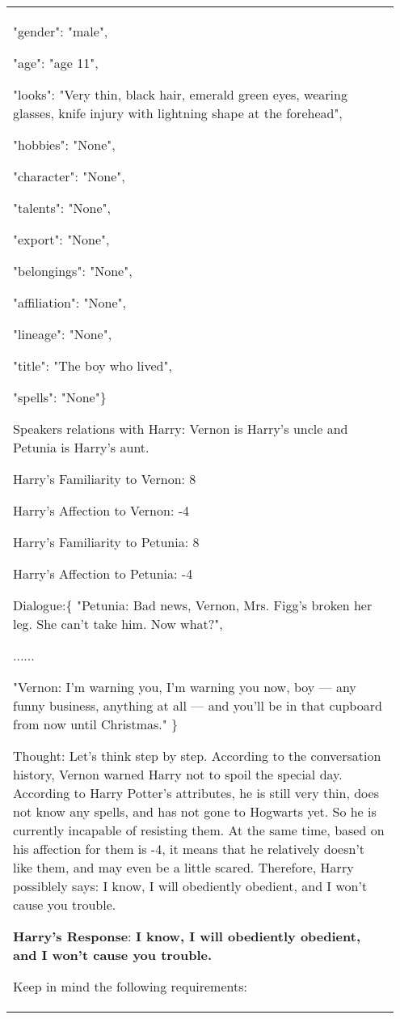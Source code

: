 \documentclass[11pt]{article}
\begin{document}
\begin{table*}[!t]
\begin{tabular}{p{0.95\linewidth}}
    "gender": "male",
    
    "age": "age 11",
    
    "looks": "Very thin, black hair,
    emerald green eyes, wearing glasses,
    knife injury with lightning shape at the forehead",
    
    "hobbies": "None",
    
    "character": "None",
    
    "talents": "None",
    
    "export": "None",
    
    "belongings": "None",
    
    "affiliation": "None",
    
    "lineage": "None",
    
    "title": "The boy who lived",
    
    "spells": "None"\}
    
            
Speakers relations with Harry:
Vernon is Harry's uncle and Petunia is Harry's aunt.

Harry’s Familiarity to Vernon: 8

Harry’s Affection to Vernon: -4

Harry's Familiarity to Petunia: 8

Harry's Affection to Petunia: -4

Dialogue:\{ 
    "Petunia: Bad news, Vernon, Mrs. Figg’s broken her leg. She can’t take him. Now what?",
    
    ......
    
   
    
    "Vernon: I’m warning you, I’m warning you now, boy — any funny business, anything at all — and you’ll be in that cupboard from now until Christmas."
\}

Thought: Let's think step by step. According to the conversation history, Vernon warned Harry not to spoil the special day. According to Harry Potter's attributes, he is still very thin, does not know any spells, and has not gone to Hogwarts yet. So he is currently incapable of resisting them. At the same time, based on his affection for them is -4, it means that he relatively doesn't like them, and may even be a little scared. Therefore, Harry possiblely says: I know, I will obediently obedient, and I won't cause you trouble.

\textbf{Harry's Response}: \textbf{I know, I will obediently obedient, and I won't cause you trouble.}

Keep in mind the following requirements:


\end{tabular}
\end{table*}
\end{document}
